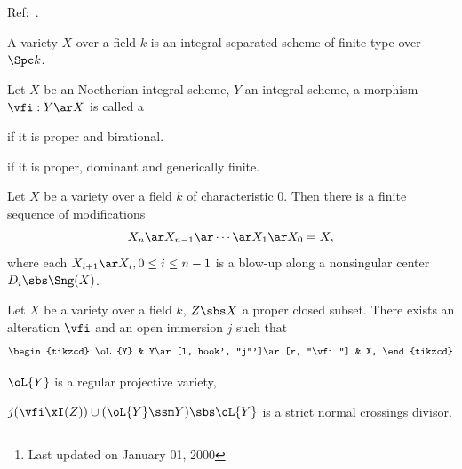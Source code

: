 \documentclass[a4paper, twoside]{article}
\begin{document}
\ifmain
    \title{}
    \author{Cong Wen, 02/23}
    \makeatletter
    \makeatother

    \maketitle
    \begin{abstract}
        Notes\footnote{Last updated on January 01, 2000} on desingularization.
    \end{abstract}

    \tableofcontents
\fi


Ref:~\cite{Hironaka1964,deJong1996}.


\begin{stp}
	A variety $X$ over a field $k$ is an integral separated scheme of finite type over $\Spc k$.
\end{stp}

\begin{dfn}
	Let $X$ be an Noetherian integral scheme, $Y$ an integral scheme, a morphism $\vfi:Y\ar X$ is called a
	\begin{enr}
		\item \cite[2.17]{deJong1996}  if it is proper and birational.
		\item \cite[2.20]{deJong1996}  if it is proper, dominant and generically finite.
	\end{enr}
\end{dfn}


\begin{thm}
	Let $X$ be a variety over a field $k$ of characteristic $0$. Then there is a finite sequence of modifications
	\[
		X_{n}\ar X_{n-1}\ar\cdots\ar X_{1}\ar X_{0}=X,
	\]
	where each $X_{i+1}\ar X_{i}, 0\leq i\leq n-1$ is a blow-up along a nonsingular center $D_{i}\sbs\Sng(X)$.
\end{thm}


\begin{thm}
	Let $X$ be a variety over a field $k$, $Z\sbs X$ a proper closed subset. There exists an alteration $\vfi$ and an open immersion $j$ such that
	\[
		\begin{tikzcd}
			\oL{Y} & Y\ar[l, hook', "j"']\ar[r, "\vfi"] & X,
		\end{tikzcd}
	\]
	\begin{enr}
		\item $\oL{Y}$ is a regular projective variety,
		\item $j(\vfi\xI(Z))\cup(\oL{Y}\ssm Y)\sbs \oL{Y}$ is a strict normal crossings divisor.
	\end{enr}
\end{thm}
\end{document}

